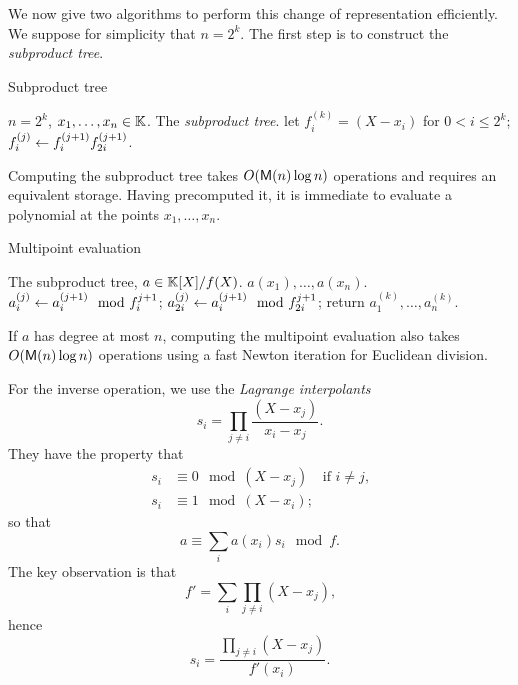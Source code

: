 We now give two algorithms to perform this change of representation
efficiently. We suppose for simplicity that $n=2^k$. The first step is
to construct the \emph{subproduct tree}.

\begin{algorithm}
  \caption{\label{alg:subprod}Subproduct tree}
  \begin{algorithmic}[1]
    \REQUIRE $n=2^k$, $x_1,\ldots,x_n\in\mathbb{K}$.
    \ENSURE The \emph{subproduct tree}.
    \STATE let $f_i^{(k)}=(X-x_i)$ for $0<i\le2^k$;
    \STATE $f^{(j)}_i \leftarrow f^{(j+1)}_if^{(j+1)}_{2i}$.
    \ENDFOR
    \ENDFOR
  \end{algorithmic}
\end{algorithm}

Computing the subproduct tree takes $O(\mathsf{M}(n)\log n)$ operations and
requires an equivalent storage. Having precomputed it, it is immediate
to evaluate a polynomial at the points $x_1,\ldots,x_n$.

\begin{algorithm}
  \caption{Multipoint evaluation}
  \begin{algorithmic}[1]
    \REQUIRE The subproduct tree, $a\in\mathbb{K}[X]/f(X)$.
    \ENSURE $a(x_1),\ldots,a(x_n)$.
    \STATE $a_i^{(j)} \leftarrow a_i^{(j+1)} \mod f_{i}^{j+1}$;
    \STATE $a_{2i}^{(j)} \leftarrow a_i^{(j+1)} \mod f_{2i}^{j+1}$;
    \ENDFOR
    \ENDFOR
    \STATE return $a_1^{(k)},\ldots,a_n^{(k)}$.
  \end{algorithmic}
\end{algorithm}

If $a$ has degree at most $n$, computing the
multipoint evaluation also takes
$O(\mathsf{M}(n)\log n)$ operations using a fast Newton iteration for
Euclidean division.

For the inverse operation, we use the
\emph{Lagrange interpolants} 
\begin{equation}
  \label{eq:223}
  s_i = \prod_{j\ne i}\frac{(X-x_j)}{x_i-x_j}
  \text{.}
\end{equation}
They have the property that
\begin{equation}
  \label{eq:224}
  \begin{aligned}
    s_i &\equiv 0 \mod (X-x_j) &\text{if $i\ne j$,}\\
    s_i &\equiv 1 \mod (X-x_i)\text{;}
  \end{aligned}
\end{equation}
so that
\begin{equation}
  \label{eq:225}
  a \equiv \sum_i a(x_i)s_i \mod f
  \text{.}
\end{equation}
The key observation is that
\begin{equation}
  \label{eq:226}
  f' = \sum_{i}\prod_{j\ne i}(X-x_j)
  \text{,}
\end{equation}
hence
\begin{equation}
  \label{eq:227}
  s_i = \frac{\prod_{j\ne i}(X-x_j)}{f'(x_i)}
  \text{.}
\end{equation}


